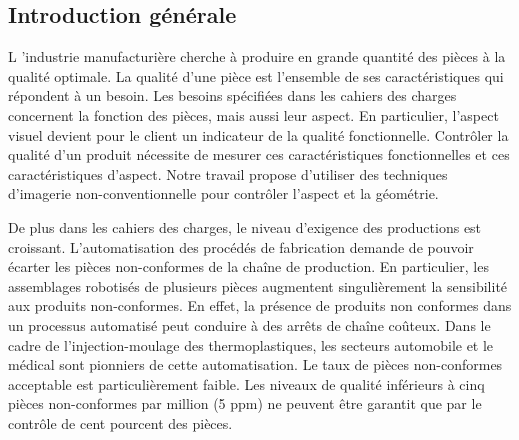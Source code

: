 {}

\vspace*{-1cm}
\begin{flushright}
\section*{\fontsize{20pt}{20pt}\selectfont\textnormal{Introduction générale}}
\end{flushright}
\vspace{2cm}

\chead[\fancyplain{}{}]
      {\fancyplain{}{}}
\lfoot[\fancyplain{}{}]%
      {\fancyplain{}{}}
\cfoot[\fancyplain{}{\thepage}]
      {\fancyplain{}{\thepage}}
\rfoot[\fancyplain{}{}]%
     {\fancyplain{}{\scriptsize}}
     

\lettrine[lines=1]{L}{ }'industrie manufacturière cherche à produire en grande quantité des pièces à la qualité optimale.
La qualité d'une pièce est l'ensemble de ses caractéristiques qui répondent à un besoin.
Les besoins spécifiées dans les cahiers des charges concernent la fonction des pièces, mais aussi leur aspect.
En particulier, l'aspect visuel devient pour le client un indicateur de la qualité fonctionnelle.
Contrôler la qualité d'un produit nécessite de mesurer ces caractéristiques fonctionnelles et ces caractéristiques d'aspect.
Notre travail propose d'utiliser des techniques d'imagerie non-conventionnelle pour contrôler l'aspect et la géométrie.

De plus dans les cahiers des charges, le niveau d'exigence des productions est croissant.
L'automatisation des procédés de fabrication demande de pouvoir écarter les pièces non-conformes de la chaîne de production.
En particulier, les assemblages robotisés de plusieurs pièces augmentent singulièrement la sensibilité aux produits non-conformes.
En effet, la présence de produits non conformes dans un processus automatisé peut conduire à des arrêts de chaîne coûteux.
Dans le cadre de l'injection-moulage des thermoplastiques, les secteurs automobile et le médical sont pionniers de cette automatisation. 
Le taux de pièces non-conformes acceptable est particulièrement faible.
Les niveaux de qualité inférieurs à cinq pièces non-conformes par million (5 ppm) ne peuvent être garantit que par le contrôle de cent pourcent des pièces.


